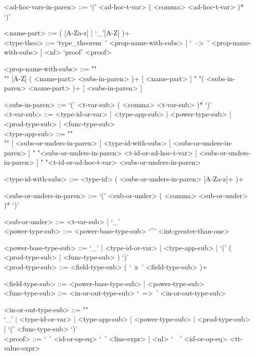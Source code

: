 \documentclass{article}
\begin{document}
\begin{grammar}
<ad-hoc-vars-in-paren> ::= `(' <ad-hoc-t-var> ( <comma> <ad-hoc-t-var> )* `)'

<name-part> ::= ( [A-Za-z] | `_'[A-Z] )+
\\

<type-theo> ::= 
`type_theorem\ ' <prop-name-with-subs> [ `\ -->\ ' <prop-name-with-subs> ] <nl> 
`proof' <proof>

<prop-name-with-subs> ::=  ""\\""
[A-Z] ( <name-part> <subs-in-paren> )+ [ <name-part> ]
\alt " "( <subs-in-paren> <name-part> )+ [ <subs-in-paren> ]

<subs-in-paren> ::= `(' <t-var-sub> ( <comma> <t-var-sub> )* `)'
\\

<t-var-sub> ::=
<type-id-or-var> | <type-app-sub> | <power-type-sub> | <prod-type-sub> |
<func-type-sub> 
\\

<type-app-sub> ::= ""\\""
[ <subs-or-unders-in-paren> ] <type-id-with-subs> [ <subs-or-unders-in-paren> ]
\alt
" "<subs-or-unders-in-paren> <t-id-or-ad-hoc-t-var> [ <subs-or-unders-in-paren> ]
\alt
" "<t-id-or-ad-hoc-t-var> <subs-or-unders-in-paren>

<type-id-with-subs> ::= <type-id> ( <subs-or-unders-in-paren> [A-Za-z]+ )+

<subs-or-unders-in-paren> ::=
`(' <sub-or-under> ( <comma> <sub-or-under> )* `)'

<sub-or-under> ::= <t-var-sub> | `_'
\\

<power-type-sub> ::= <power-base-type-sub> `^' <int-greater-than-one>

<power-base-type-sub> ::= 
`_' | <type-id-or-var> | <type-app-sub> |
`(' ( <prod-type-sub> | <func-type-sub> ) `)'
\\

<prod-type-sub> ::= <field-type-sub> ( `\ x\ ' <field-type-sub> )+

<field-type-sub> ::= <power-base-type-sub> | <power-type-sub>
\\

<func-type-sub> ::= <in-or-out-type-sub> `\ =>\ ' <in-or-out-type-sub>

<in-or-out-type-sub> ::= ""\\
`_' | <type-id-or-var> | <type-app-sub> | <power-type-sub> | <prod-type-sub> |
`(' <func-type-sub> `)'
\\

<proof> ::= 
`\ ' <id-or-op-eq> `\ ' <line-expr> | <nl> `\ \ ' <id-or-op-eq>  <tt-value-expr>


\end{grammar}
\end{document}
